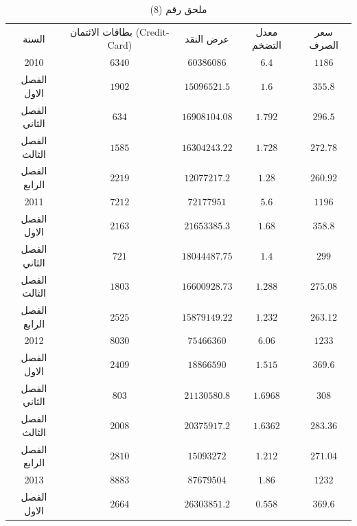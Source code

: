 \documentclass[10pt,a4paper]{report}
\begin{document}
	\begin{longtable}{|c|c|c|c|c|}
	\captionsetup{font=Large}
	\caption*{ملحق رقم (8)} \\
	\hline
	\rowcolor[HTML]{DAE8FC} 
	السنة        & بطاقات الائتمان   (Credit-Card) & عرض النقد     & معدل التضخم & سعر الصرف \\ \hline
	2010         & $6340$                          & $60386086$    & $6.4$       & $1186$    \\ \hline
	الفصل الاول  & $1902$                          & $15096521.5$  & $1.6$       & $355.8$   \\ \hline
	الفصل الثاني & $634$                           & $16908104.08$ & $1.792$     & $296.5$   \\ \hline
	الفصل الثالث & $1585$                          & $16304243.22$ & $1.728$     & $272.78$  \\ \hline
	الفصل الرابع & $2219$                          & $12077217.2$  & $1.28$      & $260.92$  \\ \hline
	2011         & $7212$                          & $72177951$    & $5.6$       & $1196$    \\ \hline
	الفصل الاول  & $2163$                          & $21653385.3$  & $1.68$      & $358.8$   \\ \hline
	الفصل الثاني & $721$                           & $18044487.75$ & $1.4$       & $299$     \\ \hline
	الفصل الثالث & $1803$                          & $16600928.73$ & $1.288$     & $275.08$  \\ \hline
	الفصل الرابع & $2525$                          & $15879149.22$ & $1.232$     & $263.12$  \\ \hline
	2012         & $8030$                          & $75466360$    & $6.06$      & $1233$    \\ \hline
	الفصل الاول  & $2409$                          & $18866590$    & $1.515$     & $369.6$   \\ \hline
	الفصل الثاني & $803$                           & $21130580.8$  & $1.6968$    & $308$     \\ \hline
	الفصل الثالث & $2008$                          & $20375917.2$  & $1.6362$    & $283.36$  \\ \hline
	الفصل الرابع & $2810$                          & $15093272$    & $1.212$     & $271.04$  \\ \hline
	2013         & $8883$                          & $87679504$    & $1.86$      & $1232$    \\ \hline
	الفصل الاول  & $2664$                          & $26303851.2$  & $0.558$     & $369.6$   \\ \hline

\end{longtable}
\end{document}

